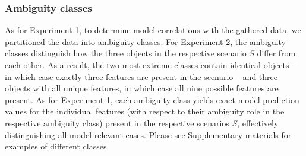 \documentclass[10pt,a4paper]{article}
\begin{document}
\subsubsection*{Ambiguity classes}
As for Experiment 1, to determine model correlations with the gathered data, we partitioned the data into ambiguity classes. 
For Experiment 2, the ambiguity classes distinguish how the three objects in the respective scenario $S$ differ from each other.
As a result, the two most extreme classes contain identical objects -- in which case exactly three features are present in the scenario -- and three objects with all unique features, in which case all nine possible features are present. 
As for Experiment 1, each ambiguity class yields exact model prediction values for the individual features (with respect to their ambiguity role in the respective ambiguity class) present in the respective scenarios $S$, effectively distinguishing all model-relevant cases. Please see Supplementary materials for examples of different classes.
\end{document}
